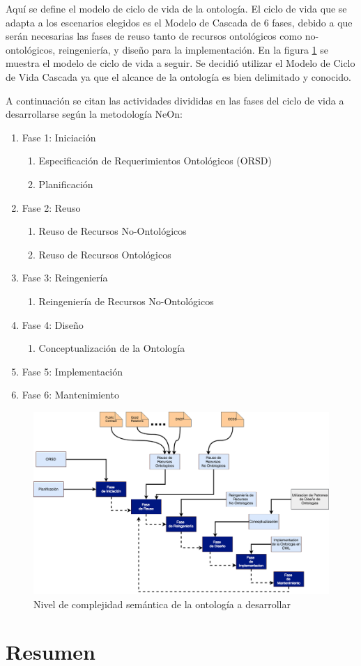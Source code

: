 Aquí se define el modelo de ciclo de vida de la ontología. El ciclo de vida que se adapta a los escenarios elegidos es el Modelo de Cascada de 6 fases, debido a que serán necesarias las fases de reuso tanto de recursos ontológicos como no-ontológicos, reingeniería, y diseño para la implementación. En la figura \ref{img:secuencia de desarrollo} se muestra el modelo de ciclo de vida a seguir. Se decidió utilizar el Modelo de Ciclo de Vida Cascada ya que el alcance de la ontología es bien delimitado y conocido.

A continuación se citan las actividades divididas en las fases del ciclo de vida a desarrollarse según la metodología NeOn:
\begin{enumerate}
\item Fase 1: Iniciación
\begin{enumerate}
\item Especificación de Requerimientos Ontológicos (ORSD)
\item Planificación 
\end{enumerate}
\item Fase 2: Reuso
\begin{enumerate}
\item Reuso de Recursos No-Ontológicos
\item Reuso de Recursos Ontológicos
\end{enumerate}
\item Fase 3: Reingeniería
\begin{enumerate}
\item Reingeniería de Recursos No-Ontológicos
\end{enumerate}
\item Fase 4: Diseño
\begin{enumerate}
\item Conceptualización de la Ontología
\end{enumerate}
\item Fase 5: Implementación
\item Fase 6: Mantenimiento

\end{enumerate}

\begin{figure}[h!]
\centering
\includegraphics[width=150mm]{figuras/Diagramas-Grafico de Secuencias Desarrollo.png}
\caption{Nivel de complejidad semántica de la ontología a desarrollar}
\label{img:secuencia de desarrollo}
\end{figure}

 


\section{Resumen}

